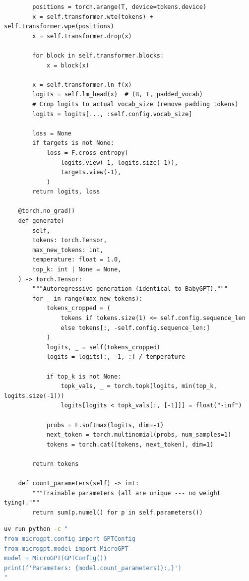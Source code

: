 \begin{lstlisting}
        positions = torch.arange(T, device=tokens.device)
        x = self.transformer.wte(tokens) + self.transformer.wpe(positions)
        x = self.transformer.drop(x)

        for block in self.transformer.blocks:
            x = block(x)

        x = self.transformer.ln_f(x)
        logits = self.lm_head(x)  # (B, T, padded_vocab)
        # Crop logits to actual vocab_size (remove padding tokens)
        logits = logits[..., :self.config.vocab_size]

        loss = None
        if targets is not None:
            loss = F.cross_entropy(
                logits.view(-1, logits.size(-1)),
                targets.view(-1),
            )
        return logits, loss

    @torch.no_grad()
    def generate(
        self,
        tokens: torch.Tensor,
        max_new_tokens: int,
        temperature: float = 1.0,
        top_k: int | None = None,
    ) -> torch.Tensor:
        """Autoregressive generation (identical to BabyGPT)."""
        for _ in range(max_new_tokens):
            tokens_cropped = (
                tokens if tokens.size(1) <= self.config.sequence_len
                else tokens[:, -self.config.sequence_len:]
            )
            logits, _ = self(tokens_cropped)
            logits = logits[:, -1, :] / temperature

            if top_k is not None:
                topk_vals, _ = torch.topk(logits, min(top_k, logits.size(-1)))
                logits[logits < topk_vals[:, [-1]]] = float("-inf")

            probs = F.softmax(logits, dim=-1)
            next_token = torch.multinomial(probs, num_samples=1)
            tokens = torch.cat([tokens, next_token], dim=1)

        return tokens

    def count_parameters(self) -> int:
        """Trainable parameters (all are unique --- no weight tying)."""
        return sum(p.numel() for p in self.parameters())
\end{lstlisting}


\shelltag
\begin{lstlisting}[language=bash]
uv run python -c "
from microgpt.config import GPTConfig
from microgpt.model import MicroGPT
model = MicroGPT(GPTConfig())
print(f'Parameters: {model.count_parameters():,}')
"
\end{lstlisting}


